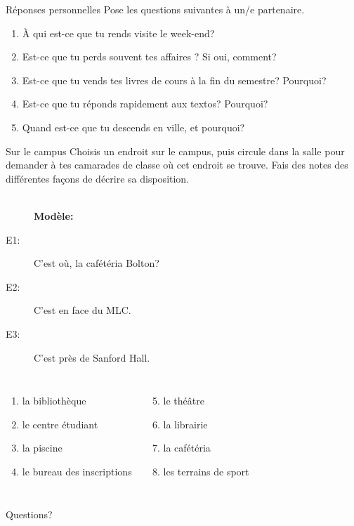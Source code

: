 \documentclass{beamer}
\begin{document}
  \begin{frame}{Réponses personnelles}
    Pose les questions suivantes à un/e partenaire. \\
    \begin{center}
      \begin{enumerate}
        \item À qui est-ce que tu rends visite le week-end?
        \item Est-ce que tu perds souvent tes affaires ? Si oui, comment?
        \item Est-ce que tu vends tes livres de cours à la fin du semestre? Pourquoi?
        \item Est-ce que tu réponds rapidement aux textos? Pourquoi?
        \item Quand est-ce que tu descends en ville, et pourquoi?
      \end{enumerate}
    \end{center}
  \end{frame}

  \begin{frame}{Sur le campus}
    Choisis un endroit sur le campus, puis circule dans la salle pour demander à tes camarades de classe où cet endroit se trouve.
    Fais des notes des différentes façons de décrire sa disposition. \\
     \\
    \begin{center}
      \begin{description}
        \item[] \textbf{Modèle:}
        \item[E1:] C'est où, la cafétéria Bolton?
        \item[E2:] C'est en face du MLC.
        \item[E3:] C'est près de Sanford Hall.
      \end{description}
    \end{center}
    \begin{columns}
        \begin{enumerate}
          \item la bibliothèque
          \item le centre étudiant
          \item la piscine
          \item le bureau des inscriptions
        \end{enumerate}
        \begin{enumerate}
          \setcounter{enumi}{4}
          \item le théâtre
          \item la librairie
          \item la cafétéria
          \item les terrains de sport
        \end{enumerate}
    \end{columns}
  \end{frame}

  \begin{frame}{}
    \begin{center}
      \Large Questions?
    \end{center}
  \end{frame}
\end{document}
